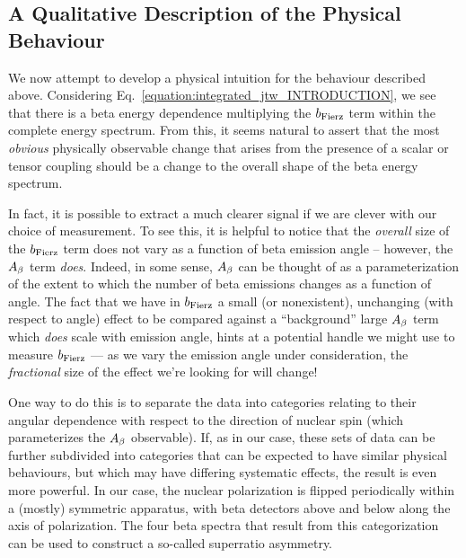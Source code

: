 {
	\pagebreak
}
{}


\subsection{A Qualitative Description of the Physical Behaviour}
\label{signature_chapter}
We now attempt to develop a physical intuition for the behaviour described above.  Considering Eq.~\ref{equation:integrated_jtw_INTRODUCTION}, we see that there is a beta energy dependence multiplying the $b_{\mathrm{Fierz}}$ term within the complete energy spectrum.  From this, it seems natural to assert that the most \emph{obvious} physically observable change that arises from the presence of a scalar or tensor coupling should be a change to the overall shape of the beta energy spectrum.  

In fact, it is possible to extract a much clearer signal if we are clever with our choice of measurement.  To see this, it is helpful to notice that the \emph{overall} size of the $b_{\mathrm{Fierz}}$ term does not vary as a function of beta emission angle -- however, the $A_{\beta}$ term \emph{does}.  Indeed, in some sense, $A_{\beta}$ can be thought of as a parameterization of the extent to which the number of beta emissions changes as a function of angle.  The fact that we have in $b_{\mathrm{Fierz}}$ a small (or nonexistent), unchanging (with respect to angle) effect to be compared against a ``background'' large $A_{\beta}$ term which \emph{does} scale with emission angle, hints at a potential handle we might use to measure $b_{\mathrm{Fierz}}$ --- as we vary the emission angle under consideration, the \emph{fractional} size of the effect we're looking for will change!

One way to do this is to separate the data into categories relating to their angular dependence with respect to the direction of nuclear spin (which parameterizes the $A_{\beta}$ observable).  If, as in our case, these sets of data can be further subdivided into categories that can be expected to have similar physical behaviours, but which may have differing systematic effects, the result is even more powerful.  In our case, the nuclear polarization is flipped periodically within a (mostly) symmetric apparatus, with beta detectors above and below along the axis of polarization.  The four beta spectra that result from this categorization can be used to construct a so-called superratio asymmetry.   

